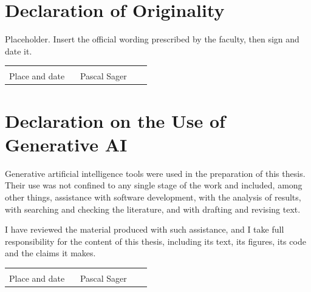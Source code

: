 %

\chapter*{Declaration of Originality}

Placeholder. Insert the official wording prescribed by the faculty, then sign
and date it.

\vspace{3\baselineskip}
\noindent
\begin{tabular}{@{}p{0.45\linewidth}p{0.45\linewidth}@{}}
\hrulefill & \hrulefill \\[-2pt]
{\small Place and date} & {\small Pascal Sager} \\
\end{tabular}


\chapter*{Declaration on the Use of Generative AI}


Generative artificial intelligence tools were used in the preparation of this
thesis. Their use was not confined to any single stage of the work and
included, among other things, assistance with software development, with the
analysis of results, with searching and checking the literature, and with
drafting and revising text.

I have reviewed the material produced with such assistance, and I take full
responsibility for the content of this thesis, including its text, its
figures, its code and the claims it makes.

\vspace{3\baselineskip}
\noindent
\begin{tabular}{@{}p{0.45\linewidth}p{0.45\linewidth}@{}}
\hrulefill & \hrulefill \\[-2pt]
{\small Place and date} & {\small Pascal Sager} \\
\end{tabular}
